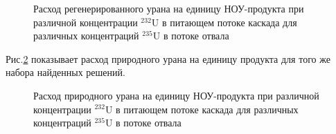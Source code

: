 \begin{figure}[ht]
  \caption{Расход регенерированного урана на единицу НОУ-продукта  при различной концентрации $^{232}$U в питающем потоке каскада для различных концентраций $^{235}$U в потоке отвала}\label{sc3_1.second}
\end{figure}

Рис.\ref{sc3_2.second} показывает расход природного урана на единицу продукта для того же набора найденных решений.

\begin{figure}[ht]
  \caption{Расход природного урана на единицу НОУ-продукта  при различной концентрации $^{232}$U в питающем потоке каскада для различных концентраций $^{235}$U в потоке отвала}\label{sc3_2.second}
\end{figure}


